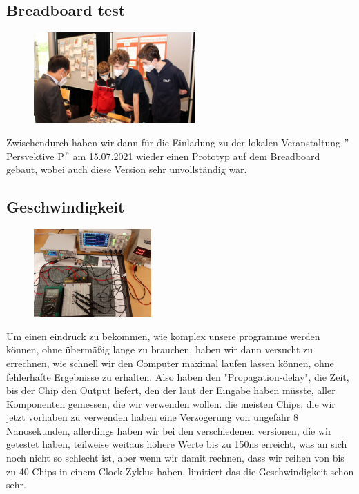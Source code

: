 \documentclass{scrartcl}
\begin{document}
    \subsection{Breadboard test}
        \begin{figure}
        \vspace{-40pt}
        \begin{center}
        \includegraphics[width=0.55\textwidth]{Perspektive_P}
        \end{center}
        \vspace{-50pt}
        \end{figure}
    Zwischendurch haben wir dann für die Einladung zu der lokalen Veranstaltung
    $"$Persvektive P$"$ am 15.07.2021 wieder einen Prototyp auf dem Breadboard gebaut, wobei auch diese Version sehr unvollständig war.

    \subsection{Geschwindigkeit}
        \begin{figure}
        \vspace{-20pt}
        \begin{center}
        \includegraphics[width=0.4\textwidth]{20211208_200750_}
        \end{center}
        \vspace{-20pt}
        \end{figure}

    Um einen eindruck zu bekommen, wie komplex unsere programme werden können, ohne übermäßig lange zu brauchen, haben wir dann versucht zu errechnen, wie schnell wir den Computer maximal laufen lassen können, ohne fehlerhafte Ergebnisse zu erhalten.
    Also haben den "Propagation-delay", die Zeit, bis der Chip den Output liefert, den der laut der Eingabe haben müsste, aller Komponenten gemessen, die wir verwenden wollen.
    die meisten Chips, die wir jetzt vorhaben zu verwenden haben eine Verzögerung von ungefähr 8 Nanosekunden, allerdings haben wir bei den verschiedenen versionen, die wir getestet haben, teilweise weitaus höhere Werte bis zu 150ns erreicht, was an sich noch nicht so schlecht ist, aber wenn wir damit rechnen, dass wir reihen von bis zu 40 Chips in einem Clock-Zyklus haben, limitiert das die Geschwindigkeit schon sehr.
\end{document}
